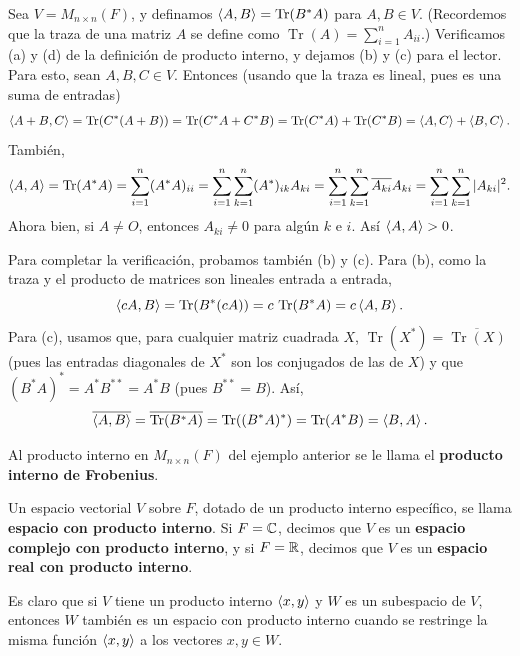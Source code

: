 \documentclass[12pt,a4paper]{book}
\renewcommand{\Tr}{\operatorname{Tr}}
\begin{document}
    \begin{ejemplo}
        Sea $V=M_{n\times n}(F)$, y definamos $\iprod{A}{B}=\Tr(B^*A)$ para $A,B\in V$. (Recordemos que la traza de una matriz $A$ se define como $\Tr(A)=\sum_{i=1}^{n}A_{ii}$.) Verificamos (a) y (d) de la definición de producto interno, y dejamos (b) y (c) para el lector. Para esto, sean $A,B,C\in V$. Entonces (usando que la traza es lineal, pues es una suma de entradas)
        \begin{align*}
            \iprod{A+B}{C}=\Tr(C^*(A+B))=\Tr(C^*A+C^*B)=\Tr(C^*A)+\Tr(C^*B)=\iprod{A}{C}+\iprod{B}{C}.
        \end{align*}
        También,
        \begin{align*}
            \iprod{A}{A}=\Tr(A^*A)=\sum_{i=1}^{n}(A^*A)_{ii}=\sum_{i=1}^{n}\sum_{k=1}^{n}(A^*)_{ik}A_{ki}
            =\sum_{i=1}^{n}\sum_{k=1}^{n}\overline{A_{ki}}A_{ki}=\sum_{i=1}^{n}\sum_{k=1}^{n}|A_{ki}|^2.
        \end{align*}
        Ahora bien, si $A\neq O$, entonces $A_{ki}\neq 0$ para algún $k$ e $i$. Así $\left\langle A, A \right\rangle>0$.

        Para completar la verificación, probamos también (b) y (c). Para (b), como la traza y el producto de matrices son lineales entrada a entrada,
        \begin{equation*}
            \iprod{cA}{B}=\Tr(B^*(cA))=c\,\Tr(B^*A)=c\iprod{A}{B}.
        \end{equation*}
        Para (c), usamos que, para cualquier matriz cuadrada $X$, $\Tr(X^*)=\overline{\Tr(X)}$ (pues las entradas diagonales de $X^*$ son los conjugados de las de $X$) y que $(B^*A)^*=A^*B^{**}=A^*B$ (pues $B^{**}=B$). Así,
        \begin{equation*}
            \overline{\iprod{A}{B}}=\overline{\Tr(B^*A)}=\Tr((B^*A)^*)=\Tr(A^*B)=\iprod{B}{A}.
        \end{equation*}
    \end{ejemplo}

    Al producto interno en $M_{n\times n}(F)$ del ejemplo anterior se le llama el \textbf{producto interno de Frobenius}.

    Un espacio vectorial $V$ sobre $F$, dotado de un producto interno específico, se llama \textbf{espacio con producto interno}. Si $F=\mathbb{C}$, decimos que $V$ es un \textbf{espacio complejo con producto interno}, y si $F=\mathbb{R}$, decimos que $V$ es un \textbf{espacio real con producto interno}.

    Es claro que si $V$ tiene un producto interno $\left\langle x, y \right\rangle$ y $W$ es un subespacio de $V$, entonces $W$ también es un espacio con producto interno cuando se restringe la misma función $\left\langle x, y \right\rangle$ a los vectores $x,y\in W$.
\end{document}
